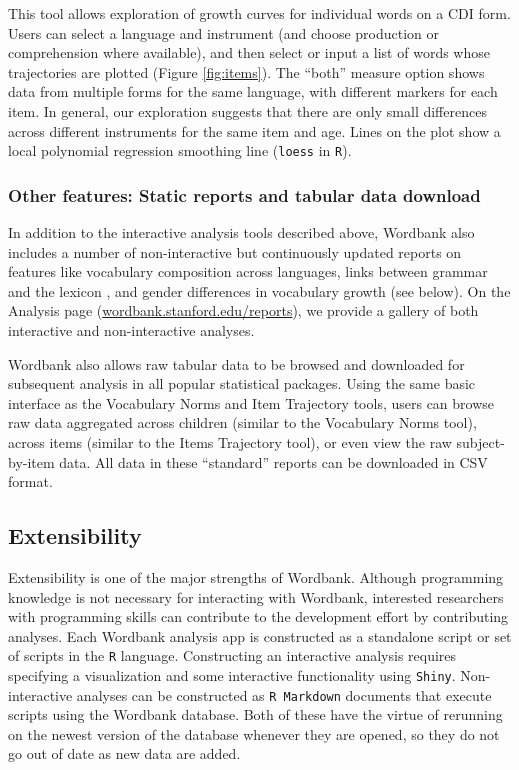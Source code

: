 \documentclass[doc,noapacite]{apa2}
\begin{document}
This tool allows exploration of growth curves for individual words on a CDI form. Users can select a language and instrument (and choose production or comprehension where available), and then select or input a list of words whose trajectories are plotted (Figure \ref{fig:items}). The ``both'' measure option shows data from multiple forms for the same language, with different markers for each item. In general, our exploration suggests that there are only small differences across different instruments for the same item and age. Lines on the plot show a local polynomial regression smoothing line (\texttt{loess} in \texttt{R}). 

\subsubsection{Other features: Static reports and tabular data download}

In addition to the interactive analysis tools described above, Wordbank also includes a number of non-interactive but continuously updated reports on features like vocabulary composition across languages, links between grammar and the lexicon \cite{braginsky2015}, and gender differences in vocabulary growth (see below). On the Analysis page (\url{wordbank.stanford.edu/reports}), we provide a gallery of both interactive and non-interactive analyses. 

Wordbank also allows raw tabular data to be browsed and downloaded for subsequent analysis in all popular statistical packages. Using the same basic interface as the Vocabulary Norms and Item Trajectory tools, users can browse raw data aggregated across children (similar to the Vocabulary Norms tool), across items (similar to the Items Trajectory tool), or even view the raw subject-by-item data. All data in these ``standard'' reports can be downloaded in CSV format. 

\subsection{Extensibility}

Extensibility is one of the major strengths of Wordbank. Although programming knowledge is not necessary for interacting with Wordbank, interested researchers with programming skills can contribute to the development effort by contributing analyses. Each Wordbank analysis app is constructed as a standalone script or set of scripts in the \texttt{R} language. Constructing an interactive analysis requires specifying a visualization and some interactive functionality using \texttt{Shiny}. Non-interactive analyses can be constructed as \texttt{R Markdown} documents that execute scripts using the Wordbank database. Both of these have the virtue of rerunning on the newest version of the database whenever they are opened, so they do not go out of date as new data are added. 
\end{document}
